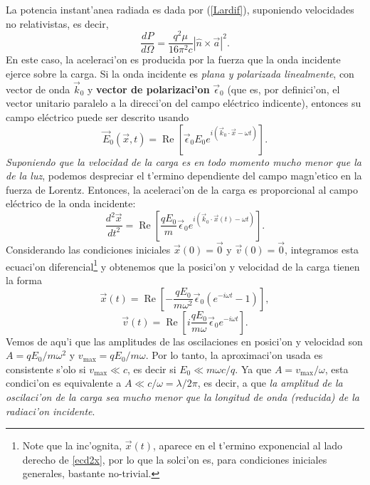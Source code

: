 La potencia instant'anea radiada es dada por (\ref{Lardif}), suponiendo velocidades no relativistas, es decir, 
\begin{equation}
\frac{dP}{d\Omega}=\frac{q^2\mu}{16\pi^2 c}|\hat{n}\times\vec{a}|^2.
\end{equation}
En este caso, la aceleraci'on es producida por la fuerza que la onda incidente ejerce sobre la carga. Si la onda incidente es \textit{plana y polarizada linealmente}, con vector de onda $\vec{k}_0$ y \textbf{vector de polarizaci'on} $\vec{\epsilon}_0$ (que es, por definici'on, el vector unitario paralelo a la direcci'on del campo eléctrico indicente), entonces su campo eléctrico puede ser descrito usando
\begin{equation}
\vec{E}_0(\vec{x},t)=\operatorname{Re}\left[
\vec{\epsilon}_0E_0e^{i(\vec{k}_0\cdot\vec{x}-\omega t)}\right] .
\end{equation}
\textit{Suponiendo que la velocidad de la carga es en todo momento mucho menor que la de la luz}, podemos despreciar el t'ermino dependiente del campo magn'etico en la fuerza de Lorentz. Entonces, la aceleraci'on de la carga es proporcional al campo eléctrico de la onda incidente:
\begin{equation}\label{ecd2x}
\frac{d^2\vec{x}}{dt^2}
=\operatorname{Re}\left[\frac{qE_0}{m}\vec{\epsilon}_0e^{i(\vec{k}_0\cdot\vec{x}(t)
-\omega t)}\right] .
\end{equation}
Considerando las condiciones iniciales $\vec{x}(0)=\vec{0}$ y $\vec{v}(0)=\vec{0}$, integramos esta ecuaci'on diferencial\footnote{Note que la inc'ognita, $\vec{x}(t)$, aparece en el t'ermino exponencial al lado derecho de \eqref{ecd2x}, por lo que la solci'on es, para condiciones iniciales generales, bastante no-trivial.} y obtenemos que la posici'on y velocidad de la carga tienen la forma
\begin{equation}
\vec{x}(t)
=\operatorname{Re}\left[-\frac{qE_0}{m\omega^2}\vec{\epsilon}_0(e^{-i\omega t}-1)\right] ,
\end{equation}
\begin{equation}
\vec{v}(t)
=\operatorname{Re}\left[i\frac{qE_0}{m\omega}\vec{\epsilon}_0e^{-i\omega t}\right] .
\end{equation}
Vemos de aqu'i que las amplitudes de las oscilaciones en posici'on y velocidad son
$A={qE_0}/{m\omega^2}$ y $v_{\max}={qE_0}/{m\omega}$. Por lo
tanto, la aproximaci'on usada es consistente s'olo si $v_{\max}\ll c$, es decir si
$E_0\ll {m\omega c}/{q}$. Ya que $A={v_{\max}}/{\omega}$, esta condici'on
es equivalente a $A\ll c/\omega=\lambda/2\pi$, es decir, a que \textit{la amplitud de la oscilaci'on de la carga sea mucho menor que la longitud de onda (reducida) de la radiaci'on incidente}.

